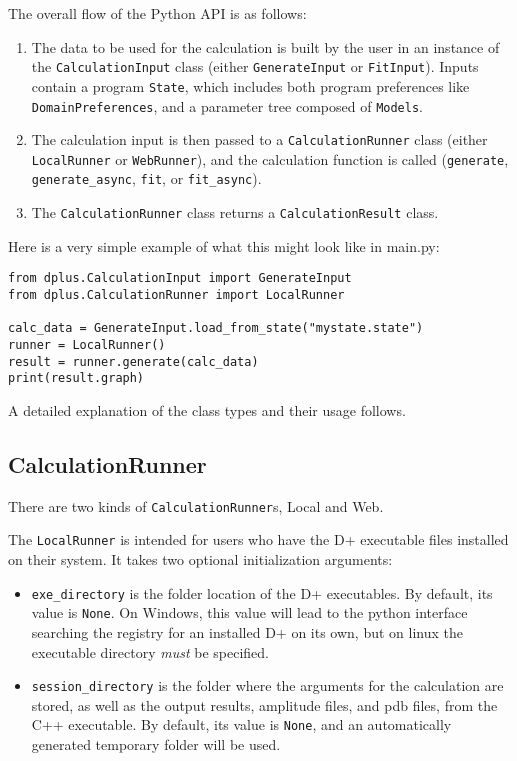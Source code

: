 \documentclass[../D+Manual.tex]{subfiles}
\begin{document}
The overall flow of the Python API is as follows:
\begin{enumerate}
	\item {The data to be used for the calculation is built by the user in an
		instance of the \texttt{CalculationInput} class (either
		\texttt{GenerateInput} or \texttt{FitInput}). Inputs contain a program \texttt{State}, which includes both program preferences 
		like \texttt{DomainPreferences}, and a parameter tree composed of \texttt{Models}.}
	\item {The calculation input is then passed to a \texttt{CalculationRunner} class
		(either \texttt{LocalRunner} or \texttt{WebRunner}), and the calculation
		function is called (\texttt{generate}, \texttt{generate\_async},
		\texttt{fit}, or \texttt{fit\_async}).}
	\item {The \texttt{CalculationRunner} class returns a 		\texttt{CalculationResult} class.}
\end{enumerate}

\noindent Here is a very simple example of what this might look like in main.py:

\begin{lstlisting}[style=pythonstyle]
from dplus.CalculationInput import GenerateInput
from dplus.CalculationRunner import LocalRunner

calc_data = GenerateInput.load_from_state("mystate.state")
runner = LocalRunner()
result = runner.generate(calc_data)
print(result.graph)
\end{lstlisting}

\noindent A detailed explanation of the class types and their usage follows.

\subsection{CalculationRunner}\label{calculationrunner}

There are two kinds of \texttt{CalculationRunner}s, Local and Web.

The \texttt{LocalRunner} is intended for users who have the D+ executable files
installed on their system. It takes two optional initialization
arguments:

\begin{itemize}
	\tightlist
	\item
	\texttt{exe\_directory} is the folder location of the D+ executables.
	By default, its value is \texttt{None}. On Windows, this value will 
	lead to the python interface searching the registry for an installed D+ on its own, but on linux the executable directory \textit{must} be specified. 
	\item
	\texttt{session\_directory} is the folder where the arguments for the
	calculation are stored, as well as the output results, amplitude
	files, and pdb files, from the C++ executable. By default, its value
	is \texttt{None}, and an automatically generated temporary folder will be used.
\end{itemize}
\end{document}
